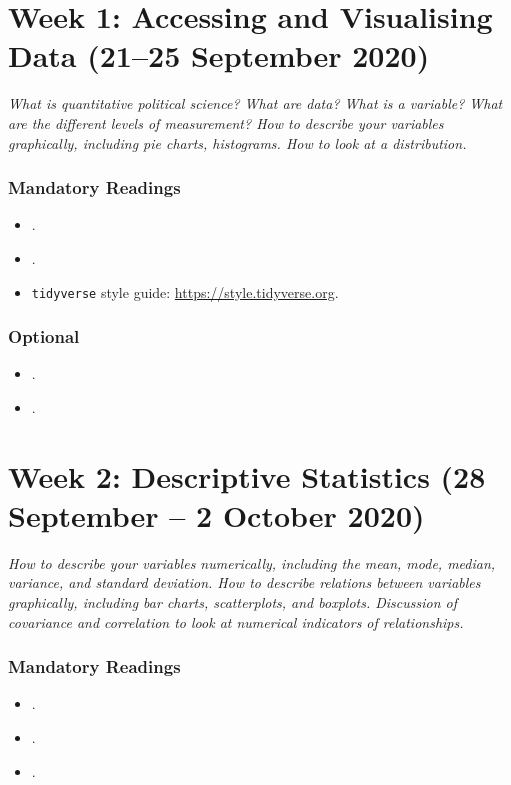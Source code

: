 \documentclass[abstract=on,parskip=full,headings=standardclasses,fontsize=11pt,paper=a4]{scrartcl}
\begin{document}
\tableofcontents

\section{Week 1: Accessing and Visualising Data (21--25 September 2020)}


\textit{What is quantitative political science? What are data? What is a variable? What are the different levels of measurement? How to describe your variables graphically, including pie charts, histograms. How to look at a distribution.}

\subsubsection*{Mandatory Readings}
\begin{itemize}
\item {}.
\item {}.
\item \texttt{tidyverse} style guide: \url{https://style.tidyverse.org}.
\end{itemize}

\subsubsection*{Optional}
\begin{itemize}
\item {}.
\item {}.
\end{itemize}

\section{Week 2: Descriptive Statistics (28 September -- 2 October 2020)}

\textit{How to describe your variables numerically, including the mean, mode, median, variance, and standard deviation. How to describe relations between variables graphically, including bar charts, scatterplots, and boxplots. Discussion of covariance and correlation to look at numerical indicators of relationships.}

\subsubsection*{Mandatory Readings}
\begin{itemize}
\item {}.
\item {}.
\item {}.
\end{itemize}
\end{document}
